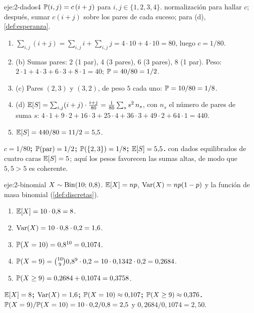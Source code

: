\begin{solucion}{eje:2-dados4}
\datos $\mathbb{P}(i,j)=c\,(i+j)$ para $i,j\in\{1,2,3,4\}$.
\planteamiento normalización para hallar $c$; después, sumar $c(i+j)$ sobre los pares de cada suceso; para (d), \cref{def:esperanza}.
\pasos
\begin{enumerate}[label=\arabic*.]
  \item $\sum_{i,j}(i+j)=\sum_{i,j}i+\sum_{i,j}j=4\cdot 10+4\cdot 10=80$, luego $c=1/80$.
  \item (b) Sumas pares: 2 (1 par), 4 (3 pares), 6 (3 pares), 8 (1 par). Peso: $2\cdot 1+4\cdot 3+6\cdot 3+8\cdot 1=40$; $\mathbb{P}=40/80=1/2$.
  \item (c) Pares $(2,3)$ y $(3,2)$, de peso $5$ cada uno: $\mathbb{P}=10/80=1/8$.
  \item (d) $\mathbb{E}[S]=\sum_{i,j}(i+j)\cdot\frac{i+j}{80}=\frac1{80}\sum_s s^{2}\,n_s$, con $n_s$ el número de pares de suma $s$: $4\cdot 1+9\cdot 2+16\cdot 3+25\cdot 4+36\cdot 3+49\cdot 2+64\cdot 1=440$.
  \item $\mathbb{E}[S]=440/80=11/2=5{,}5$.
\end{enumerate}
\resultado \textbf{$c=1/80$; $\mathbb{P}(\text{par})=1/2$; $\mathbb{P}(\{2,3\})=1/8$; $\mathbb{E}[S]=5{,}5$.}
\comprobacion con dados equilibrados de cuatro caras $\mathbb{E}[S]=5$; aquí los pesos favorecen las sumas altas, de modo que $5{,}5>5$ es coherente.
\end{solucion}

\begin{solucion}{eje:2-binomial}
\datos $X\sim\operatorname{Bin}(10;\,0{,}8)$.
\planteamiento $\mathbb{E}[X]=np$, $\operatorname{Var}(X)=np(1-p)$ y la función de masa binomial (\cref{def:discretas}).
\pasos
\begin{enumerate}[label=\arabic*.]
  \item $\mathbb{E}[X]=10\cdot 0{,}8=8$.
  \item $\operatorname{Var}(X)=10\cdot 0{,}8\cdot 0{,}2=1{,}6$.
  \item $\mathbb{P}(X=10)=0{,}8^{10}=0{,}1074$.
  \item $\mathbb{P}(X=9)=\binom{10}{9}0{,}8^{9}\cdot 0{,}2=10\cdot 0{,}1342\cdot 0{,}2=0{,}2684$.
  \item $\mathbb{P}(X\ge 9)=0{,}2684+0{,}1074=0{,}3758$.
\end{enumerate}
\resultado \textbf{$\mathbb{E}[X]=8$; $\operatorname{Var}(X)=1{,}6$; $\mathbb{P}(X=10)\approx 0{,}107$; $\mathbb{P}(X\ge 9)\approx 0{,}376$.}
\comprobacion $\mathbb{P}(X=9)/\mathbb{P}(X=10)=10\cdot 0{,}2/0{,}8=2{,}5$ y $0{,}2684/0{,}1074=2{,}50$.
\end{solucion}

